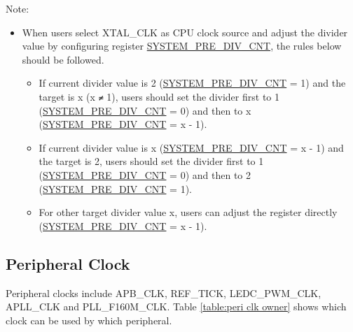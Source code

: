\documentclass[main\_\_EN.tex]{subfiles}
\begin{document}
Note:
    \begin{itemize}
        \item When users select XTAL\_CLK as CPU clock source and adjust the divider value by configuring register \hyperref[fielddesc:SYSTEMPREDIVCNT]{SYSTEM\_PRE\_DIV\_CNT}, the rules below should be followed.
        \begin{itemize}
            \item If current divider value is 2 (\hyperref[fielddesc:SYSTEMPREDIVCNT]{SYSTEM\_PRE\_DIV\_CNT} = 1) and the target is x (x \verb+≠+ 1), users should set the divider first to 1 (\hyperref[fielddesc:SYSTEMPREDIVCNT]{SYSTEM\_PRE\_DIV\_CNT} = 0) and then to x (\hyperref[fielddesc:SYSTEMPREDIVCNT]{SYSTEM\_PRE\_DIV\_CNT} = x - 1).
            \item If current divider value is x (\hyperref[fielddesc:SYSTEMPREDIVCNT]{SYSTEM\_PRE\_DIV\_CNT} = x - 1) and the target is 2, users should set the divider first to 1 (\hyperref[fielddesc:SYSTEMPREDIVCNT]{SYSTEM\_PRE\_DIV\_CNT} = 0) and then to 2 (\hyperref[fielddesc:SYSTEMPREDIVCNT]{SYSTEM\_PRE\_DIV\_CNT} = 1).
            \item For other target divider value x, users can adjust the register directly (\hyperref[fielddesc:SYSTEMPREDIVCNT]{SYSTEM\_PRE\_DIV\_CNT} = x - 1).
        \end{itemize}
    \end{itemize}

\subsection{Peripheral Clock}
Peripheral clocks include APB\_CLK, REF\_TICK, LEDC\_PWM\_CLK, APLL\_CLK and PLL\_F160M\_CLK. Table \ref{table:peri clk owner} shows which clock can be used by which peripheral.
\end{document}
